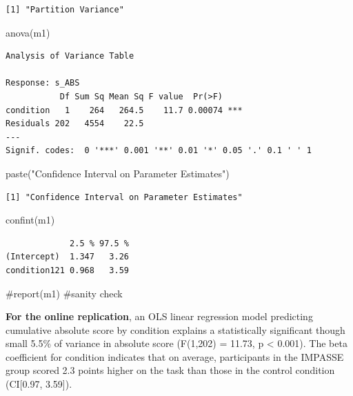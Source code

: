 \documentclass[
  letterpaper,
  DIV=11,
  numbers=noendperiod]{scrreprt}
\newenvironment{Shaded}{\begin{snugshade}}{\end{snugshade}}
\newcommand{\CommentTok}[1]{\textcolor[rgb]{0.37,0.37,0.37}{#1}}
\newcommand{\FunctionTok}[1]{\textcolor[rgb]{0.28,0.35,0.67}{#1}}
\newcommand{\NormalTok}[1]{\textcolor[rgb]{0.00,0.23,0.31}{#1}}
\newcommand{\StringTok}[1]{\textcolor[rgb]{0.13,0.47,0.30}{#1}}
\begin{document}
\begin{verbatim}
[1] "Partition Variance"
\end{verbatim}

\begin{Shaded}
\begin{Highlighting}[]
\FunctionTok{anova}\NormalTok{(m1)}
\end{Highlighting}
\end{Shaded}

\begin{verbatim}
Analysis of Variance Table

Response: s_ABS
           Df Sum Sq Mean Sq F value  Pr(>F)    
condition   1    264   264.5    11.7 0.00074 ***
Residuals 202   4554    22.5                    
---
Signif. codes:  0 '***' 0.001 '**' 0.01 '*' 0.05 '.' 0.1 ' ' 1
\end{verbatim}

\begin{Shaded}
\begin{Highlighting}[]
\FunctionTok{paste}\NormalTok{(}\StringTok{"Confidence Interval on Parameter Estimates"}\NormalTok{)}
\end{Highlighting}
\end{Shaded}

\begin{verbatim}
[1] "Confidence Interval on Parameter Estimates"
\end{verbatim}

\begin{Shaded}
\begin{Highlighting}[]
\FunctionTok{confint}\NormalTok{(m1)}
\end{Highlighting}
\end{Shaded}

\begin{verbatim}
             2.5 % 97.5 %
(Intercept)  1.347   3.26
condition121 0.968   3.59
\end{verbatim}

\begin{Shaded}
\begin{Highlighting}[]
\CommentTok{\#report(m1) \#sanity check}
\end{Highlighting}
\end{Shaded}

\textbf{For the online replication}, an OLS linear regression model
predicting cumulative absolute score by condition explains a
statistically significant though small 5.5\% of variance in absolute
score (F(1,202) = 11.73, p \textless{} 0.001). The beta coefficient for
condition indicates that on average, participants in the IMPASSE group
scored 2.3 points higher on the task than those in the control condition
(CI{[}0.97, 3.59{]}).
\end{document}
